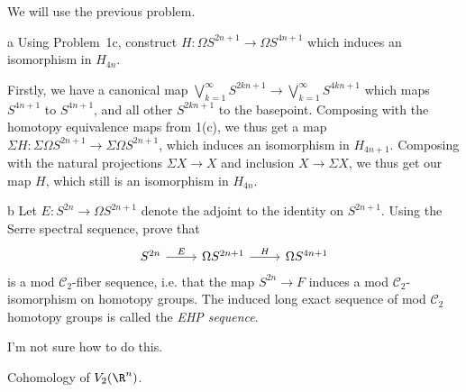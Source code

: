 \documentclass[11pt,letterpaper]{article}
\begin{document}
\begin{solution}
    We will use the previous problem.
    \begin{partproblem}{a}
        Using Problem~1c, construct $H : \Omega S^{2n+1} \to \Omega S^{4n+1}$ which induces an isomorphism in $H_{4n}$.
    \end{partproblem}

    \quad Firstly, we have a canonical map $\bigvee_{k=1}^\infty S^{2kn+1} \to \bigvee_{k=1}^\infty S^{4kn+1}$ which maps $S^{4n+1}$ to $S^{4n+1}$, and all other $S^{2kn+1}$ to the basepoint. Composing with the homotopy equivalence maps from 1(c), we thus get a map $\Sigma H : \Sigma\Omega S^{2n+1} \to \Sigma \Omega S^{2n+1}$, which induces an isomorphism in $H_{4n+1}$. Composing with the natural projections $\Sigma X \to X$ and inclusion $X \to \Sigma X$, we thus get our map $H$, which still is an isomorphism in $H_{4n}$.

    \begin{partproblem}{b}
        Let $E : S^{2n} \to \Omega S^{2n+1}$ denote the adjoint to the identity on $S^{2n+1}$. Using the Serre spectral sequence, prove that
        \[\begin{tikzcd}
            S^{2n} & \Omega S^{2n+1} & \Omega S^{4n+1}
            \arrow["E", from=1-1, to=1-2]
            \arrow["H", from=1-2, to=1-3]
        \end{tikzcd}\]
        is a mod $\mathcal{C}_2$-fiber sequence, i.e. that the map $S^{2n} \to F$ induces a mod $\mathcal{C}_2$-isomorphism on homotopy groups. The induced long exact sequence of mod $\mathcal{C}_2$ homotopy groups is called the \emph{EHP sequence}.
    \end{partproblem}

    \quad I'm not sure how to do this.
\end{solution}

\begin{problem}
    Cohomology of $V_2(\R^n)$.
\end{problem}
\end{document}
